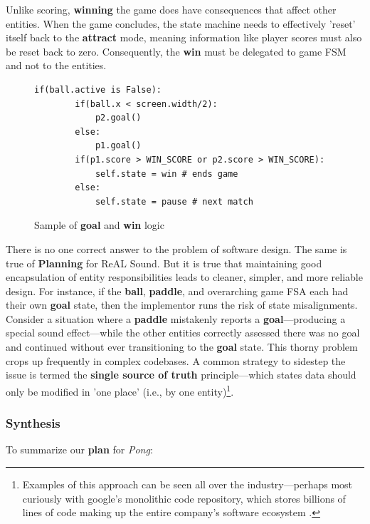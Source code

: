 \documentclass{report}
\newcommand{\rs}{ReAL Sound\xspace}
\newcommand{\plan}{\textbf{Planning}\xspace}
\newcommand{\state}[1]{\textbf{#1}}
\newcommand{\pad}{\textbf{paddle}\xspace}
\newcommand{\ball}{\textbf{ball}\xspace}
\newcommand{\tech}[1]{\textbf{#1}}
\begin{document}
Unlike scoring, \state{winning} the game does have consequences that affect other entities. When the game concludes, the state machine needs to effectively 'reset' itself back to the \state{attract} mode, meaning information like player scores must also be reset back to zero. Consequently, the \state{win} must be delegated to game FSM and not to the entities.   

\begin{figure}[h]

    \lstset{language=Python}
    \begin{lstlisting}[frame=single]
    if(ball.active is False):
        if(ball.x < screen.width/2):
            p2.goal()
        else:
            p1.goal()
        if(p1.score > WIN_SCORE or p2.score > WIN_SCORE):
            self.state = win # ends game
        else: 
            self.state = pause # next match
    \end{lstlisting}
    
    \caption{Sample of \state{goal} and \state{win} logic}
    \label{fig:code_goal_example}
\end{figure}


There is no one correct answer to the problem of software design. The same is true of \plan for \rs. But it is true that maintaining good encapsulation of entity responsibilities leads to cleaner, simpler, and more reliable design. For instance, if the \ball, \pad, and overarching game FSA each had their own \state{goal} state, then the implementor runs the risk of state misalignments. Consider a situation where a \pad mistakenly reports a \state{goal}---producing a special sound effect---while the other entities correctly assessed there was no goal and continued without ever transitioning to the \state{goal} state. This thorny problem crops up frequently in complex codebases. A common strategy to sidestep the issue is termed the \tech{single source of truth} principle---which states data should only be modified in 'one place' (i.e., by one entity)\footnote{Examples of this approach can be seen all over the industry---perhaps most curiously with google's monolithic code repository, which stores billions of lines of code making up the entire company's software ecosystem \cite{googleRepo}.}.

\subsubsection{Synthesis}
To summarize our \state{plan} for \emph{Pong}:
\end{document}
